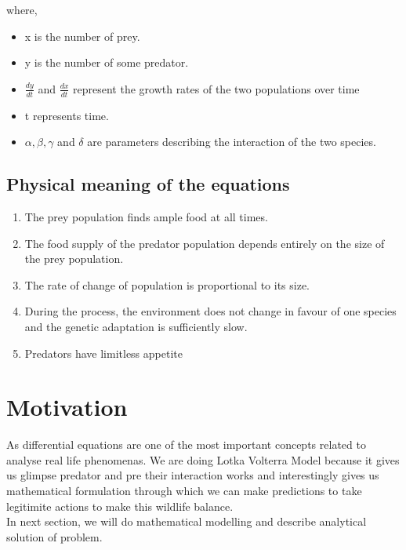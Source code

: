 \documentclass[12pt]{article}
\begin{document}
where,
\begin{itemize}
    \item x is the number of prey.
    \item y is the number of some predator.
    \item $ \frac { d y } { d t } $ and $ \frac { d x } { d t } $ represent the growth rates of the two populations over time
    \item t represents time.
    \item $ \alpha , \beta , \gamma $ and $ \delta $ are parameters describing the interaction of the two species.
\end{itemize}
\subsection*{Physical meaning of the equations}
\begin{enumerate}
    \item The prey population finds ample food at all times.
    \item The food supply of the predator population depends entirely on the size of the prey population.
    \item The rate of change of population is proportional to its size.
    \item During the process, the environment does not change in favour of one species and the genetic adaptation is sufficiently slow.
    \item Predators have limitless appetite

\end{enumerate}
\newpage
\section*{Motivation}
As differential equations are one of the most important concepts related to analyse real life phenomenas. We are doing Lotka Volterra Model because it gives us glimpse predator and pre their interaction works and interestingly gives us mathematical formulation through which we can make predictions to take legitimite actions to make this wildlife balance. \\

In next section, we will do mathematical modelling and describe analytical solution of problem.


\end{document}
